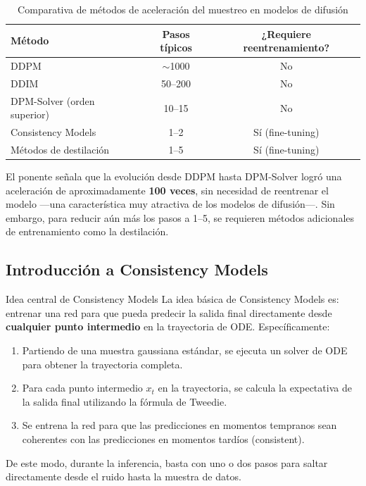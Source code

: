 \begin{table}[H]
\centering
\begin{tabular}{lcc}
\toprule
\textbf{Método} & \textbf{Pasos típicos} & \textbf{¿Requiere reentrenamiento?} \\
\midrule
DDPM & $\sim$1000 & No \\
DDIM & 50--200 & No \\
DPM-Solver (orden superior) & 10--15 & No \\
Consistency Models & 1--2 & Sí (fine-tuning) \\
Métodos de destilación & 1--5 & Sí (fine-tuning) \\
\bottomrule
\end{tabular}
\caption{Comparativa de métodos de aceleración del muestreo en modelos de difusión}
\end{table}

El ponente señala que la evolución desde DDPM hasta DPM-Solver logró una aceleración de aproximadamente \textbf{100 veces}, sin necesidad de reentrenar el modelo —una característica muy atractiva de los modelos de difusión—. Sin embargo, para reducir aún más los pasos a 1--5, se requieren métodos adicionales de entrenamiento como la destilación.

\subsection{Introducción a Consistency Models}

\begin{importantbox}{Idea central de Consistency Models}
La idea básica de Consistency Models es: entrenar una red para que pueda predecir la salida final directamente desde \textbf{cualquier punto intermedio} en la trayectoria de ODE. Específicamente:
\begin{enumerate}
    \item Partiendo de una muestra gaussiana estándar, se ejecuta un solver de ODE para obtener la trayectoria completa.
    \item Para cada punto intermedio $x_t$ en la trayectoria, se calcula la expectativa de la salida final utilizando la fórmula de Tweedie.
    \item Se entrena la red para que las predicciones en momentos tempranos sean coherentes con las predicciones en momentos tardíos (consistent).
\end{enumerate}
De este modo, durante la inferencia, basta con uno o dos pasos para saltar directamente desde el ruido hasta la muestra de datos.
\end{importantbox}


